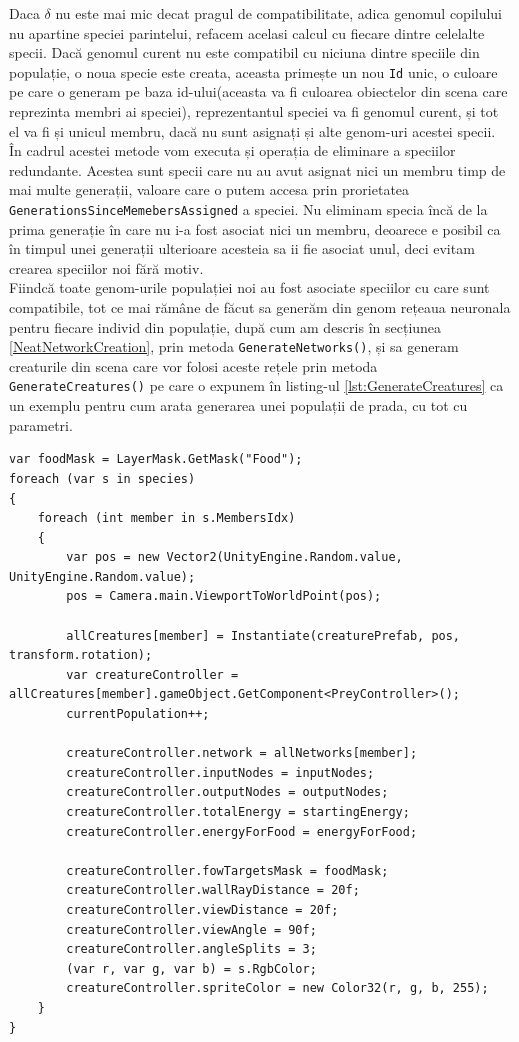 Daca $\delta$ nu este mai mic decat pragul de compatibilitate, adica genomul copilului nu apartine speciei parintelui, refacem acelasi calcul cu fiecare dintre celelalte specii.
Dacă genomul curent nu este compatibil cu niciuna dintre speciile din populație, o noua specie este creata, aceasta primește un nou \texttt{Id} unic, o culoare pe care o generam pe baza id-ului(aceasta va fi culoarea obiectelor din scena care reprezinta membri ai speciei), reprezentantul speciei va fi genomul curent, și tot el va fi și unicul membru, dacă nu sunt asignați și alte genom-uri acestei specii.
\\
În cadrul acestei metode vom executa și operația de eliminare a speciilor redundante. Acestea sunt specii care nu au avut asignat nici un membru timp de mai multe generații, valoare care o putem accesa prin prorietatea \texttt{Generations\-Since\-Memebers\-Assigned} a speciei.
Nu eliminam specia încă de la prima generație în care nu i-a fost asociat nici un membru, deoarece e posibil ca în timpul unei generații ulterioare acesteia sa ii fie asociat unul, deci evitam crearea speciilor noi fără motiv. 
\\
Fiindcă toate genom-urile populației noi au fost asociate speciilor cu care sunt compatibile, tot ce mai rămâne de făcut sa generăm din genom rețeaua neuronala pentru fiecare individ din populație, după cum am descris în secțiunea \ref{NeatNetworkCreation}, prin metoda \texttt{Generate\-Networks()}, și sa generam creaturile din scena care vor folosi aceste rețele prin metoda \texttt{Generate\-Creatures()} pe care o expunem în listing-ul \ref{lst:GenerateCreatures} ca un exemplu pentru cum arata generarea unei populații de prada, cu tot cu parametri.
\begin{lstlisting}[caption={Generarea speciilor de prada}, label={lst:GenerateCreatures}]
var foodMask = LayerMask.GetMask("Food");
foreach (var s in species)
{
    foreach (int member in s.MembersIdx)
    {
        var pos = new Vector2(UnityEngine.Random.value, UnityEngine.Random.value);
        pos = Camera.main.ViewportToWorldPoint(pos);

        allCreatures[member] = Instantiate(creaturePrefab, pos, transform.rotation);
        var creatureController = allCreatures[member].gameObject.GetComponent<PreyController>();
        currentPopulation++;

        creatureController.network = allNetworks[member];
        creatureController.inputNodes = inputNodes;
        creatureController.outputNodes = outputNodes;
        creatureController.totalEnergy = startingEnergy;
        creatureController.energyForFood = energyForFood;

        creatureController.fowTargetsMask = foodMask;
        creatureController.wallRayDistance = 20f;
        creatureController.viewDistance = 20f;
        creatureController.viewAngle = 90f;
        creatureController.angleSplits = 3;
        (var r, var g, var b) = s.RgbColor;
        creatureController.spriteColor = new Color32(r, g, b, 255);
    }
}
\end{lstlisting}